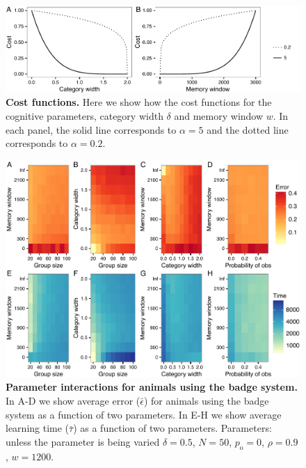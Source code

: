 \begin{figure}[ht]
\includegraphics[width=.8\textwidth]{figures/cost_functions.pdf}
\caption{\sffamily\small\textbf{Cost functions.} Here we show how the cost functions for the cognitive parameters, category width $\delta$ and memory window $w$. In each panel, the solid line corresponds to $\alpha=5$ and the dotted line corresponds to $\alpha=0.2$. }
\label{cost_fx}
\end{figure}


\begin{figure}[ht]
\includegraphics[width=.8\textwidth]{figures/parameter_interactions_badge.pdf}
\caption{\sffamily\small\textbf{Parameter interactions for animals using the badge system.}
In A-D we show average error ($\bar{\epsilon}$) for animals using the badge system as a function of two parameters. In E-H we show average learning time ($\bar{\tau}$) as a function of two parameters. Parameters: unless the parameter is being varied $\delta = 0.5$, $N=50$, $p_\text{o}=0$, $\rho=0.9$, $w=1200$.}
\label{interactions_badge}
\end{figure}

